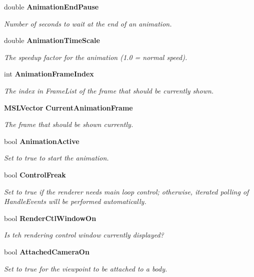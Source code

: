 \begin{CompactItemize}
double {\bf Animation\-End\-Pause}
\begin{CompactList}\small\item\em Number of seconds to wait at the end of an animation.\item\end{CompactList}\item 
double {\bf Animation\-Time\-Scale}
\begin{CompactList}\small\item\em The speedup factor for the animation (1.0 = normal speed).\item\end{CompactList}\item 
int {\bf Animation\-Frame\-Index}
\begin{CompactList}\small\item\em The index in Frame\-List of the frame that should be currently shown.\item\end{CompactList}\item 
{\bf MSLVector} {\bf Current\-Animation\-Frame}
\begin{CompactList}\small\item\em The frame that should be shown currently.\item\end{CompactList}\item 
bool {\bf Animation\-Active}
\begin{CompactList}\small\item\em Set to true to start the animation.\item\end{CompactList}\item 
bool {\bf Control\-Freak}
\begin{CompactList}\small\item\em Set to true if the renderer needs main loop control; otherwise, iterated polling of Handle\-Events will be performed automatically.\item\end{CompactList}\item 
bool {\bf Render\-Ctl\-Window\-On}
\begin{CompactList}\small\item\em Is teh rendering control window currently displayed?\item\end{CompactList}\item 
bool {\bf Attached\-Camera\-On}
\begin{CompactList}\small\item\em Set to true for the viewpoint to be attached to a body.\item\end{CompactList}\item 

\end{CompactItemize}
